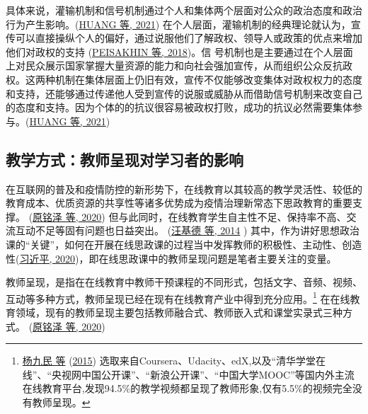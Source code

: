\documentclass[
  12pt,
]{ctexart}
\begin{document}
具体来说，灌输机制和信号机制通过个人和集体两个层面对公众的政治态度和政治行为产生影响。(\protect\hyperlink{ref-HuangCruz2021}{HUANG 等, 2021}) 在个人层面，灌输机制的经典理论就认为，宣传可以直接操纵个人的偏好，通过说服他们了解政权、领导人或政策的优点来增加他们对政权的支持 (\protect\hyperlink{ref-PeisakhinRozenas2018}{PEISAKHIN 等, 2018})。信 号机制也是主要通过在个人层面上对民众展示国家掌握大量资源的能力和向社会强加宣传，从而组织公众反抗政权。这两种机制在集体层面上仍旧有效，宣传不仅能够改变集体对政权权力的态度和支持，还能够通过传递他人受到宣传的说服或威胁从而借助信号机制来改变自己的态度和支持。因为个体的的抗议很容易被政权打败，成功的抗议必然需要集体参与。(\protect\hyperlink{ref-HuangCruz2021}{HUANG 等, 2021})

\hypertarget{ux6559ux5b66ux65b9ux5f0fux6559ux5e08ux5448ux73b0ux5bf9ux5b66ux4e60ux8005ux7684ux5f71ux54cd}{%
\subsection{教学方式：教师呈现对学习者的影响}\label{ux6559ux5b66ux65b9ux5f0fux6559ux5e08ux5448ux73b0ux5bf9ux5b66ux4e60ux8005ux7684ux5f71ux54cd}}

在互联网的普及和疫情防控的新形势下，在线教育以其较高的教学灵活性、较低的教育成本、优质资源的共享性等诸多优势成为疫情治理新常态下思政教育的重要支撑。 (\protect\hyperlink{ref-YuanMingZeEtAl2020a}{原铭泽 等, 2020}) 但与此同时，在线教育学生自主性不足、保持率不高、交流互动不足等固有问题也日益突出。 (\protect\hyperlink{ref-WangJiDeEtAl2014}{汪基德 等, 2014} ) 其中，作为讲好思想政治课的``关键''，如何在开展在线思政课的过程当中发挥教师的积极性、主动性、创造性(\protect\hyperlink{ref-XiJinPing2020}{习近平, 2020})，即在线思政课中的教师呈现问题是笔者主要关注的变量。

教师呈现，是指在在线教育中教师干预课程的不同形式，包括文字、音频、视频、互动等多种方式，教师呈现已经在现有在线教育产业中得到充分应用。\footnote{\protect\hyperlink{ref-YangJiuMinEtAl2015}{杨九民 等} (\protect\hyperlink{ref-YangJiuMinEtAl2015}{2015}) 选取来自Coursera、Udacity、edX,以及``清华学堂在线''、``央视网中国公开课''、``新浪公开课''、``中国大学MOOC''等国内外主流在线教育平台,发现94.5\%的教学视频都呈现了教师形象,仅有5.5\%的视频完全没有教师呈现。}
在在线教育领域，现有的教师呈现主要包括教师融合式、教师嵌入式和课堂实录式三种方式。
(\protect\hyperlink{ref-YuanMingZeEtAl2020a}{原铭泽 等, 2020})
\end{document}
